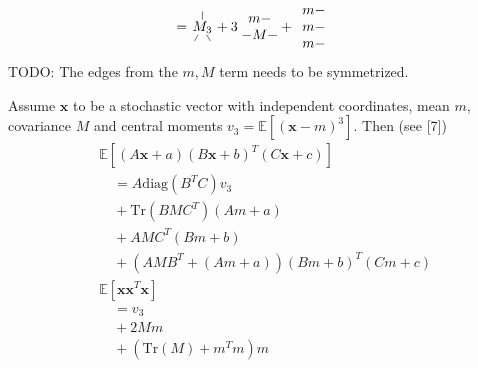 \begin{align*}
\begin{array}{c}
\end{array}
%
\\&=
\begin{tikzpicture}[baseline=(T.base), inner sep=1pt]
   \node (T) {$M_3$};
   \draw (T) -- ++(0,.4);
   \draw (T) -- ++(-.2,-.35);
   \draw (T) -- ++(.2,-.35);
\end{tikzpicture}
+
3
\hspace{-.25em}
\begin{array}{c}
   m - \\
   -M-
\end{array}
\hspace{-.5em}
+
\begin{array}{c}
   m - \\
   m - \\
   m -
\end{array}
\end{align*}
TODO: The edges from the $m,M$ term needs to be symmetrized.

Assume \(\mathbf{x}\) to be a stochastic vector with independent coordinates, mean \(m\),
covariance \(M\) and central moments \(v_3 = \mathbb{E}[(\mathbf{x} - m)^3]\). Then (see [7])
\begin{align*}
&\mathbb{E}[(A\mathbf{x} + a)(B\mathbf{x} + b)^T (C\mathbf{x} + c)]
\\&\quad=
A\mathrm{diag}(B^T C) v_3
\\&\quad+
\mathrm{Tr}(BMC^T)(Am + a)
\\&\quad+
AMC^T (Bm + b)
\\&\quad+
(AMB^T + (Am + a))(Bm + b)^T (Cm + c)
\\
  &\mathbb{E}[\mathbf{x} \mathbf{x}^T \mathbf{x}]
\\&\quad=
   v_3
\\&\quad+
   2 Mm
\\&\quad+
   (\text{Tr}(M) + m^T m) m
\end{align*}


